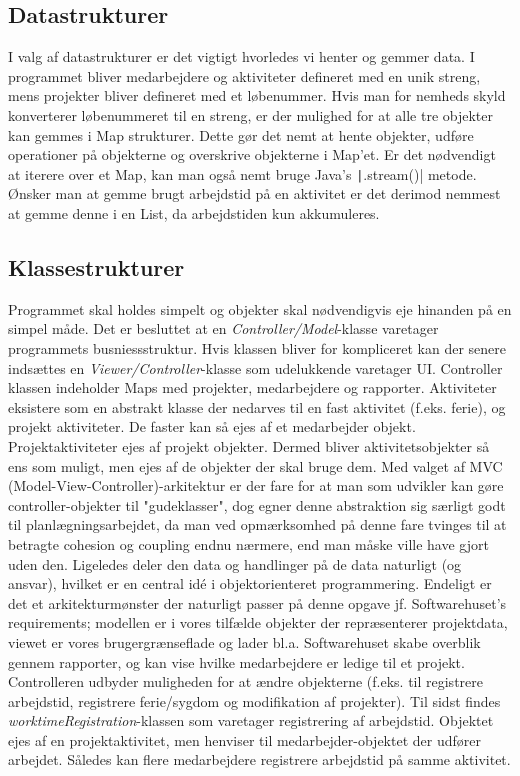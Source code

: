 \subsection{Datastrukturer} I valg af datastrukturer er det vigtigt hvorledes vi henter og gemmer data. I programmet bliver medarbejdere og aktiviteter defineret med en unik streng, mens projekter bliver defineret med et løbenummer. Hvis man for nemheds skyld konverterer løbenummeret til en streng, er der mulighed for at alle tre objekter kan gemmes i Map strukturer. Dette gør det nemt at hente objekter, udføre operationer på objekterne og overskrive objekterne i Map'et. Er det nødvendigt at iterere over et Map, kan man også nemt bruge Java's \texttt|.stream()| metode. Ønsker man at gemme brugt arbejdstid på en aktivitet er det derimod nemmest at gemme denne i en List, da arbejdstiden kun akkumuleres.
\subsection{Klassestrukturer} Programmet skal holdes simpelt og objekter skal nødvendigvis eje hinanden på en simpel måde. Det er besluttet at en \emph{Controller/Model}-klasse varetager programmets busniessstruktur. Hvis klassen bliver for kompliceret kan der senere indsættes en \emph{Viewer/Controller}-klasse som udelukkende varetager UI. Controller klassen indeholder Maps med projekter, medarbejdere og rapporter. Aktiviteter eksistere som en abstrakt klasse der nedarves til en fast aktivitet (f.eks. ferie), og projekt aktiviteter. De faster kan så ejes af et medarbejder objekt. Projektaktiviteter ejes af projekt objekter. Dermed bliver aktivitetsobjekter så ens som muligt, men ejes af de objekter der skal bruge dem. Med valget af MVC (Model-View-Controller)-arkitektur er der fare for at man som udvikler kan gøre controller-objekter til "gudeklasser", dog egner denne abstraktion sig særligt godt til planlægningsarbejdet, da man ved opmærksomhed på denne fare tvinges til at betragte cohesion og coupling endnu nærmere, end man måske ville have gjort uden den. Ligeledes deler den data og handlinger på de data naturligt (og ansvar), hvilket er en central idé i objektorienteret programmering. Endeligt er det et arkitekturmønster der naturligt passer på denne opgave jf. Softwarehuset's requirements; modellen er i vores tilfælde objekter der repræsenterer projektdata, viewet er vores brugergrænseflade og lader bl.a. Softwarehuset skabe overblik gennem rapporter, og kan vise hvilke medarbejdere er ledige til et projekt. Controlleren udbyder muligheden for at ændre objekterne (f.eks. til registrere arbejdstid, registrere ferie/sygdom og modifikation af projekter).\newline
Til sidst findes \emph{worktimeRegistration}-klassen som varetager registrering af arbejdstid. Objektet ejes af en projektaktivitet, men henviser til medarbejder-objektet der udfører arbejdet. Således kan flere medarbejdere registrere arbejdstid på samme aktivitet.